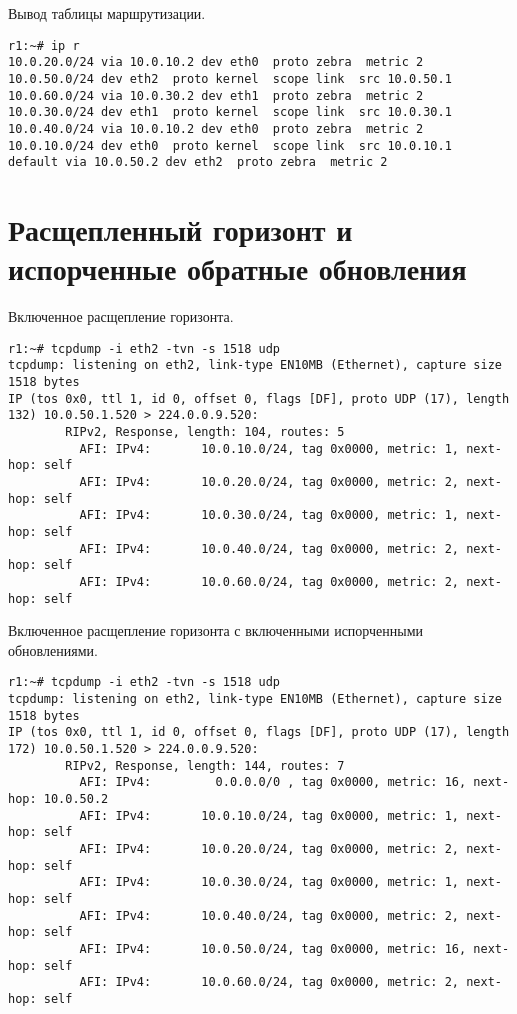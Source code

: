 \documentclass[a4paper,12pt]{article}
\begin{document}
Вывод таблицы маршрутизации.

\begin{Verbatim}
r1:~# ip r
10.0.20.0/24 via 10.0.10.2 dev eth0  proto zebra  metric 2
10.0.50.0/24 dev eth2  proto kernel  scope link  src 10.0.50.1
10.0.60.0/24 via 10.0.30.2 dev eth1  proto zebra  metric 2
10.0.30.0/24 dev eth1  proto kernel  scope link  src 10.0.30.1
10.0.40.0/24 via 10.0.10.2 dev eth0  proto zebra  metric 2
10.0.10.0/24 dev eth0  proto kernel  scope link  src 10.0.10.1
default via 10.0.50.2 dev eth2  proto zebra  metric 2
\end{Verbatim}

\section{Расщепленный горизонт и испорченные обратные обновления}

Включенное расщепление горизонта.
\begin{Verbatim}
r1:~# tcpdump -i eth2 -tvn -s 1518 udp
tcpdump: listening on eth2, link-type EN10MB (Ethernet), capture size 1518 bytes
IP (tos 0x0, ttl 1, id 0, offset 0, flags [DF], proto UDP (17), length 132) 10.0.50.1.520 > 224.0.0.9.520:
        RIPv2, Response, length: 104, routes: 5
          AFI: IPv4:       10.0.10.0/24, tag 0x0000, metric: 1, next-hop: self
          AFI: IPv4:       10.0.20.0/24, tag 0x0000, metric: 2, next-hop: self
          AFI: IPv4:       10.0.30.0/24, tag 0x0000, metric: 1, next-hop: self
          AFI: IPv4:       10.0.40.0/24, tag 0x0000, metric: 2, next-hop: self
          AFI: IPv4:       10.0.60.0/24, tag 0x0000, metric: 2, next-hop: self
\end{Verbatim}

Включенное расщепление горизонта с включенными испорченными обновлениями.
\begin{Verbatim}
r1:~# tcpdump -i eth2 -tvn -s 1518 udp
tcpdump: listening on eth2, link-type EN10MB (Ethernet), capture size 1518 bytes
IP (tos 0x0, ttl 1, id 0, offset 0, flags [DF], proto UDP (17), length 172) 10.0.50.1.520 > 224.0.0.9.520:
        RIPv2, Response, length: 144, routes: 7
          AFI: IPv4:         0.0.0.0/0 , tag 0x0000, metric: 16, next-hop: 10.0.50.2
          AFI: IPv4:       10.0.10.0/24, tag 0x0000, metric: 1, next-hop: self
          AFI: IPv4:       10.0.20.0/24, tag 0x0000, metric: 2, next-hop: self
          AFI: IPv4:       10.0.30.0/24, tag 0x0000, metric: 1, next-hop: self
          AFI: IPv4:       10.0.40.0/24, tag 0x0000, metric: 2, next-hop: self
          AFI: IPv4:       10.0.50.0/24, tag 0x0000, metric: 16, next-hop: self
          AFI: IPv4:       10.0.60.0/24, tag 0x0000, metric: 2, next-hop: self
\end{Verbatim}
\end{document}
